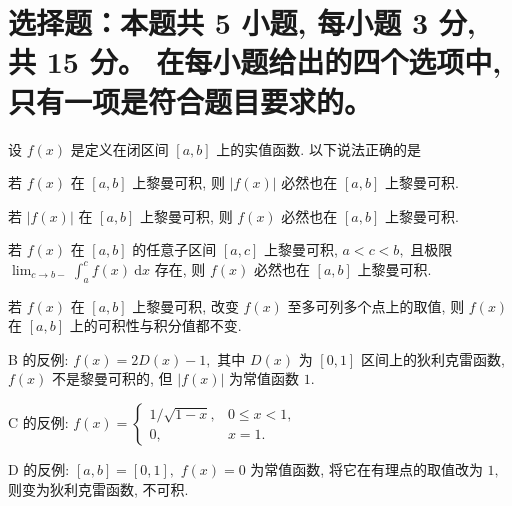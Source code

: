 \fi




\section{%
  选择题：本题共 5 小题, 每小题 3 分, 共 15 分。
  在每小题给出的四个选项中, 只有一项是符合题目要求的。
}


\begin{question}
设 $f(x)$ 是定义在闭区间 $[a, b]$ 上的实值函数. 以下说法正确的是 \paren[A]

\begin{choices}
\item 若 $f(x)$ 在 $[a, b]$ 上黎曼可积, 则 $|f(x)|$ 必然也在 $[a, b]$ 上黎曼可积.
\item 若 $|f(x)|$ 在 $[a, b]$ 上黎曼可积, 则 $f(x)$ 必然也在 $[a, b]$ 上黎曼可积.
\item 若 $f(x)$ 在 $[a, b]$ 的任意子区间 $[a, c]$ 上黎曼可积, $a < c < b,$ 且极限 $\displaystyle \lim_{c\to b-} \int_a^c f(x) ~ \mathrm{d} x$ 存在, 则 $f(x)$ 必然也在 $[a, b]$ 上黎曼可积.
\item 若 $f(x)$ 在 $[a, b]$ 上黎曼可积, 改变 $f(x)$ 至多可列多个点上的取值, 则 $f(x)$ 在 $[a, b]$ 上的可积性与积分值都不变.
\end{choices}
\end{question}

\begin{solution}
B 的反例: $f(x) = 2 D(x) - 1,$ 其中 $D(x)$ 为 $[0, 1]$ 区间上的狄利克雷函数, $f(x)$ 不是黎曼可积的, 但 $|f(x)|$ 为常值函数 $1.$

C 的反例: $\displaystyle f(x) = \begin{cases} 1/\sqrt{1- x}, & 0 \leqslant x < 1, \\ 0, & x = 1. \end{cases}$

D 的反例: $[a, b] = [0, 1],$ $f(x) = 0$ 为常值函数, 将它在有理点的取值改为 $1,$ 则变为狄利克雷函数, 不可积.
\end{solution}


